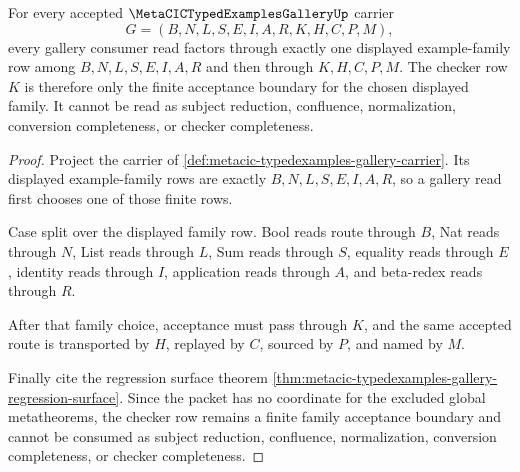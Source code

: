 \begin{theorem}
\label{thm:metacic-typedexamples-gallery-checker-route-factorization}
For every accepted $\MetaCICTypedExamplesGalleryUp$ carrier
$$
G=(B,N,L,S,E,I,A,R,K,H,C,P,M),
$$
every gallery consumer read factors through exactly one displayed example-family row among $B,N,L,S,E,I,A,R$ and then through $K,H,C,P,M$. The checker row $K$ is therefore only the finite acceptance boundary for the chosen displayed family. It cannot be read as subject reduction, confluence, normalization, conversion completeness, or checker completeness.
\end{theorem}
\begin{proof}
Project the carrier of \autoref{def:metacic-typedexamples-gallery-carrier}. Its displayed example-family rows are exactly $B,N,L,S,E,I,A,R$, so a gallery read first chooses one of those finite rows.

Case split over the displayed family row. Bool reads route through $B$, Nat reads through $N$, List reads through $L$, Sum reads through $S$, equality reads through $E$, identity reads through $I$, application reads through $A$, and beta-redex reads through $R$.

After that family choice, acceptance must pass through $K$, and the same accepted route is transported by $H$, replayed by $C$, sourced by $P$, and named by $M$.

Finally cite the regression surface theorem \autoref{thm:metacic-typedexamples-gallery-regression-surface}. Since the packet has no coordinate for the excluded global metatheorems, the checker row remains a finite family acceptance boundary and cannot be consumed as subject reduction, confluence, normalization, conversion completeness, or checker completeness.
\end{proof}

